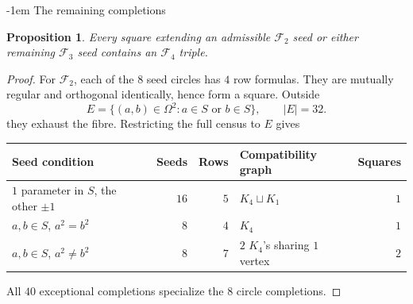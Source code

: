 \documentclass[11pt,a4paper]{article}
\makeatletter
\newtheorem{proposition}[theorem]{Proposition}
\theoremstyle{plain}
\theoremstyle{definition}
\numberwithin{equation}{section}
\renewcommand\subsection{\@startsection{subsection}{2}{\z@}  {\medskipamount}  {-1em}  {\normalfont\normalsize\bfseries}}
\makeatother
\begin{document}
\subsection{The remaining completions}\label{sec:completion}\label{completion:f2}\label{completion:f3}\label{completion:proof}
\begin{proposition}
Every square extending an admissible $\mathcal F_2$ seed or either remaining $\mathcal F_3$ seed contains an $\mathcal F_4$ triple.
\end{proposition}
\begin{proof}
For $\mathcal F_2$, each of the $8$ seed circles has $4$ row formulas. They are mutually regular and orthogonal identically, hence form a square. Outside
$$E=\{(a,b)\in\Omega^2:a\in S\text{ or }b\in S\},\qquad |E|=32.$$
they exhaust the fibre. Restricting the full census to $E$ gives
\begin{center}\small \begin{tabular}{@{}lrrlr@{}}\toprule
Seed condition & Seeds & Rows & Compatibility graph & Squares\\\midrule
$1$ parameter in $S$, the other $\pm1$ &$16$&$5$&$K_4\sqcup K_1$&$1$\\
$a,b\in S$, $a^2=b^2$ &$8$&$4$&$K_4$&$1$\\
$a,b\in S$, $a^2\ne b^2$ &$8$&$7$&$2$ $K_4$'s sharing $1$ vertex&$2$\\\bottomrule
\end{tabular}\end{center}
All $40$ exceptional completions specialize the $8$ circle completions.


\end{proof}
\end{document}

